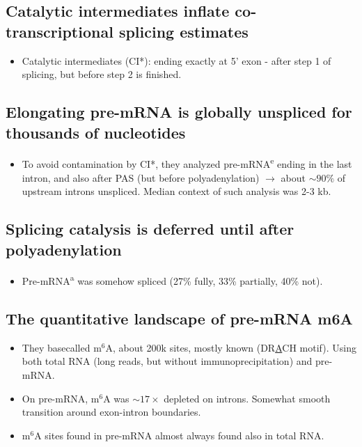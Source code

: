 \documentclass{article}
\begin{document}
	\subsection{Catalytic intermediates inflate co-transcriptional splicing estimates}

	\begin{itemize}		
		\item Catalytic intermediates (CI*): ending exactly at 5' exon - after step 1 of splicing, but before step 2 is finished.
	\end{itemize}

\subsection{Elongating pre-mRNA is globally unspliced for thousands of nucleotides}
\begin{itemize}		
	\item To avoid contamination by CI*, they analyzed pre-mRNA\textsuperscript{e} ending in the last intron, and also after PAS (but before polyadenylation) $\to$ about $\sim 90\%$ of upstream introns unspliced. Median context of such analysis was 2-3 kb.
\end{itemize}

\subsection{Splicing catalysis is deferred until after polyadenylation}
\begin{itemize}		
	\item Pre-mRNA\textsuperscript{a} was somehow spliced (27\% fully, 33\% partially, 40\% not).
\end{itemize}

\subsection{The quantitative landscape of pre-mRNA m6A}
\begin{itemize}		
	\item They basecalled $\text{m}^{6}$A, about 200k sites, mostly known (DR\underline{A}CH motif). Using both total RNA (long reads, but without immunoprecipitation) and pre-mRNA.
	\item On pre-mRNA, $\text{m}^{6}$A was $\sim 17 \times$ depleted on introns. Somewhat smooth transition around exon-intron boundaries.
	\item $\text{m}^{6}$A sites found in pre-mRNA almost always found also in total RNA.
\end{itemize}
\end{document}
